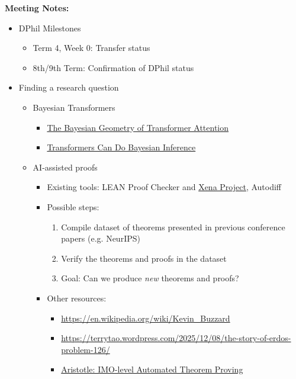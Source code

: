 \documentclass[12pt,a4paper,twoside]{article}
\begin{document}
\begin{meetingsummary}
	\textbf{Meeting Notes:}
	\begin{itemize}
		\item DPhil Milestones
		      \begin{itemize}
			      \item Term 4, Week 0: Transfer status
			      \item 8th/9th Term: Confirmation of DPhil status
		      \end{itemize}
		\item Finding a research question
		      \begin{itemize}
			      \item Bayesian Transformers
			            \begin{itemize}
				            \item \href{https://arxiv.org/abs/2512.22471}{The Bayesian Geometry of Transformer Attention}
				            \item \href{https://arxiv.org/abs/2112.10510}{Transformers Can Do Bayesian Inference}
			            \end{itemize}
			      \item AI-assisted proofs
			            \begin{itemize}
				            \item Existing tools: LEAN Proof Checker and \href{https://xenaproject.wordpress.com/what-is-the-xena-project/}{Xena Project}, Autodiff
				            \item Possible steps:
				                  \begin{enumerate}
					                  \item Compile dataset of theorems presented in previous conference papers (e.g. NeurIPS)
					                  \item Verify the theorems and proofs in the dataset
					                  \item Goal: Can we produce \textit{new} theorems and proofs?
				                  \end{enumerate}
				            \item Other resources:
				                  \begin{itemize}
					                  \item \url{https://en.wikipedia.org/wiki/Kevin_Buzzard}
					                  \item \url{https://terrytao.wordpress.com/2025/12/08/the-story-of-erdos-problem-126/}
					                  \item \href{https://arxiv.org/abs/2510.01346}{Aristotle: IMO-level Automated Theorem Proving}

\end{itemize}
\end{itemize}
\end{itemize}
\end{itemize}
\end{meetingsummary}
\end{document}
